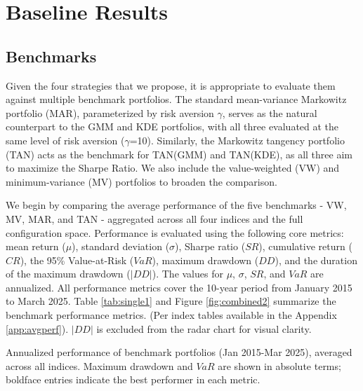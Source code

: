 \section{Baseline Results}
\subsection{Benchmarks}
Given the four strategies that we propose, it is appropriate to evaluate them against multiple benchmark portfolios. The standard mean-variance Markowitz portfolio (MAR), parameterized by risk aversion $\gamma$, serves as the natural counterpart to the GMM and KDE portfolios, with all three evaluated at the same level of risk aversion ($\gamma$=10). Similarly, the Markowitz tangency portfolio (TAN) acts as the benchmark for TAN(GMM) and TAN(KDE), as all three aim to maximize the Sharpe Ratio. We also include the value-weighted (VW) and minimum-variance (MV) portfolios to broaden the comparison.

We begin by comparing the average performance of the five benchmarks - VW, MV, MAR, and TAN - aggregated across all four indices and the full configuration space. Performance is evaluated using the following core metrics: mean return ($\mu$), standard deviation ($\sigma$), Sharpe ratio ($SR$), cumulative return ($CR$), the 95\% Value-at-Risk ($VaR$), maximum drawdown ($DD$), and the duration of the maximum drawdown ($|DD|$). The values for $\mu$, $\sigma$, $SR$, and $VaR$ are annualized. All performance metrics cover the 10-year period from January 2015 to March 2025. Table \ref{tab:single1} and Figure \ref{fig:combined2} summarize the benchmark performance metrics. (Per index tables available in the Appendix \ref{app:avgperf}). $|DD|$ is excluded from the radar chart for visual clarity.
\vspace{5mm}
\begin{table}[H]
  \centering
  
  \caption[Benchmark performance]{Annualized performance of benchmark portfolios (Jan 2015-Mar 2025), averaged across all indices. Maximum drawdown and $VaR$ are shown in absolute terms; boldface entries indicate the best performer in each metric.}
  \label{tab:single1}
\end{table}

